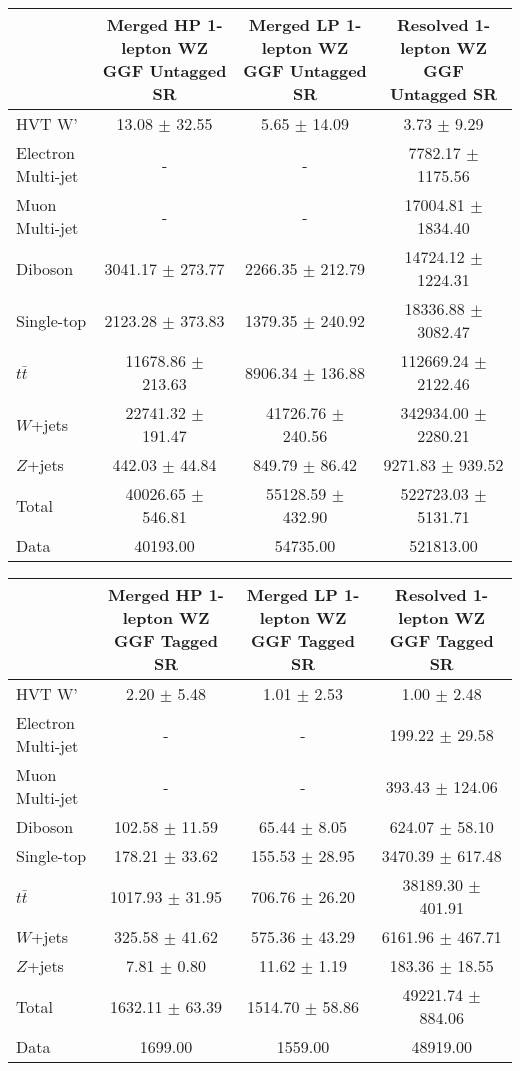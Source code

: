\begin{tabular}{|l|c|c|c|}
\hline
	  &	Merged HP 1-lepton WZ GGF Untagged SR &	Merged LP 1-lepton WZ GGF Untagged SR &	Resolved 1-lepton WZ GGF Untagged SR \\\hline 
	HVT W' &	13.08 $\pm$ 32.55 &	5.65 $\pm$ 14.09 &	3.73 $\pm$ 9.29 \\\hline 
	Electron Multi-jet &	- &	- &	7782.17 $\pm$ 1175.56 \\\hline 
	Muon Multi-jet &	- &	- &	17004.81 $\pm$ 1834.40 \\\hline 
	Diboson &	3041.17 $\pm$ 273.77 &	2266.35 $\pm$ 212.79 &	14724.12 $\pm$ 1224.31 \\\hline 
	Single-top &	2123.28 $\pm$ 373.83 &	1379.35 $\pm$ 240.92 &	18336.88 $\pm$ 3082.47 \\\hline 
	$t\bar{t}$ &	11678.86 $\pm$ 213.63 &	8906.34 $\pm$ 136.88 &	112669.24 $\pm$ 2122.46 \\\hline 
	$W$+jets &	22741.32 $\pm$ 191.47 &	41726.76 $\pm$ 240.56 &	342934.00 $\pm$ 2280.21 \\\hline 
	$Z$+jets &	442.03 $\pm$ 44.84 &	849.79 $\pm$ 86.42 &	9271.83 $\pm$ 939.52 \\\hline 
	Total &	40026.65 $\pm$ 546.81 &	55128.59 $\pm$ 432.90 &	522723.03 $\pm$ 5131.71 \\\hline 
	Data &	40193.00 &	54735.00 &	521813.00 \\\hline 
\end{tabular}

\begin{tabular}{|l|c|c|c|}
\hline
	  &	Merged HP 1-lepton WZ GGF Tagged SR &	Merged LP 1-lepton WZ GGF Tagged SR &	Resolved 1-lepton WZ GGF Tagged SR \\\hline 
	HVT W' &	2.20 $\pm$ 5.48 &	1.01 $\pm$ 2.53 &	1.00 $\pm$ 2.48 \\\hline 
	Electron Multi-jet &	- &	- &	199.22 $\pm$ 29.58 \\\hline 
	Muon Multi-jet &	- &	- &	393.43 $\pm$ 124.06 \\\hline 
	Diboson &	102.58 $\pm$ 11.59 &	65.44 $\pm$ 8.05 &	624.07 $\pm$ 58.10 \\\hline 
	Single-top &	178.21 $\pm$ 33.62 &	155.53 $\pm$ 28.95 &	3470.39 $\pm$ 617.48 \\\hline 
	$t\bar{t}$ &	1017.93 $\pm$ 31.95 &	706.76 $\pm$ 26.20 &	38189.30 $\pm$ 401.91 \\\hline 
	$W$+jets &	325.58 $\pm$ 41.62 &	575.36 $\pm$ 43.29 &	6161.96 $\pm$ 467.71 \\\hline 
	$Z$+jets &	7.81 $\pm$ 0.80 &	11.62 $\pm$ 1.19 &	183.36 $\pm$ 18.55 \\\hline 
	Total &	1632.11 $\pm$ 63.39 &	1514.70 $\pm$ 58.86 &	49221.74 $\pm$ 884.06 \\\hline 
	Data &	1699.00 &	1559.00 &	48919.00 \\\hline 
\end{tabular}
